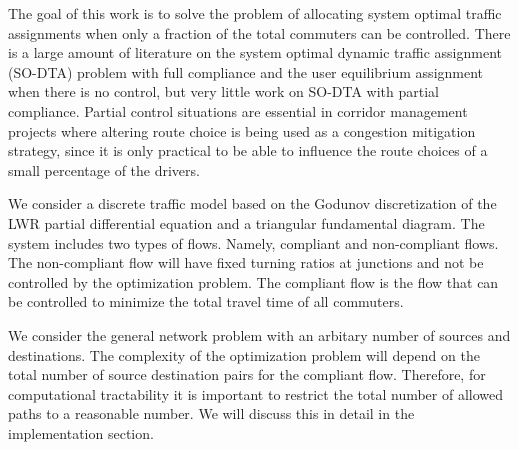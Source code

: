 

The goal of this work is to solve the problem of allocating system optimal traffic assignments when only a fraction of the total commuters can be controlled. There is a large amount of literature on the system optimal dynamic traffic assignment (SO-DTA) problem with full compliance and the user equilibrium assignment when there is no control, but very little work on SO-DTA with partial compliance. Partial control situations are essential in corridor management projects where altering route choice is being used as a congestion mitigation strategy, since it is only practical to be able to influence the route choices of a small percentage of the drivers. 

We consider a discrete traffic model based on the Godunov discretization of the LWR partial differential equation and a triangular fundamental diagram. The system includes two types of flows. Namely, compliant and non-compliant flows. The non-compliant flow will have fixed turning ratios at junctions and not be controlled by the optimization problem. The compliant flow is the flow that can be controlled to minimize the total travel time of all commuters. 

We consider the general network problem with an arbitary number of sources and destinations. The complexity of the optimization problem will depend on the total number of source destination pairs for the compliant flow. Therefore, for computational tractability it is important to restrict the total number of allowed paths to a reasonable number. We will discuss this in detail in the implementation section. 

